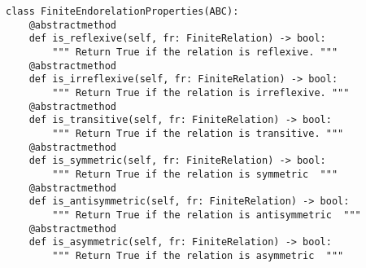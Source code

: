 \begin{verbatim}
class FiniteEndorelationProperties(ABC):
    @abstractmethod
    def is_reflexive(self, fr: FiniteRelation) -> bool:
        """ Return True if the relation is reflexive. """
    @abstractmethod
    def is_irreflexive(self, fr: FiniteRelation) -> bool:
        """ Return True if the relation is irreflexive. """
    @abstractmethod
    def is_transitive(self, fr: FiniteRelation) -> bool:
        """ Return True if the relation is transitive. """
    @abstractmethod
    def is_symmetric(self, fr: FiniteRelation) -> bool:
        """ Return True if the relation is symmetric  """
    @abstractmethod
    def is_antisymmetric(self, fr: FiniteRelation) -> bool:
        """ Return True if the relation is antisymmetric  """
    @abstractmethod
    def is_asymmetric(self, fr: FiniteRelation) -> bool:
        """ Return True if the relation is asymmetric  """
\end{verbatim}